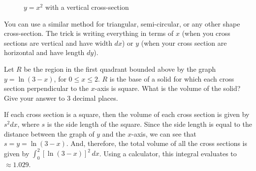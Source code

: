 \begin{figure}[htbp]
\centering
	\caption{$y = x^2$ with a vertical cross-section}
	\label{fig:parab} 
\end{figure}

You can use a similar method for triangular, semi-circular, or any other shape 
cross-section. The trick is writing everything in terms of $x$ (when you cross 
sections are vertical and have width $dx$) or $y$ (when your cross section are 
horizontal and have length $dy$). 

\begin{Exercise} Let $R$ be the region in the first 
quadrant bounded above by the graph $y = \ln{(3 - x)}$, for $0 \leq x \leq 2$. 
$R$ is the base of a solid for which each cross section perpendicular to the 
$x$-axis is square. What is the volume of the solid? Give your answer to 3 
decimal places. 
\end{Exercise}

\begin{Answer}[ref=AP_87]
If each cross section is a square, then the volume of each cross section is 
given by $s^2 dx$, where $s$ is the side length of the square. Since the side 
length is equal to the distance between the graph of $y$ and the $x$-axis, we 
can see that $s = y = \ln{(3 - x)}$. And, therefore, the total volume of all 
the cross sections is given by $\int_0^2 \left[\ln{(3 - x)} \right]^2\,dx$. 
Using a calculator, this integral evaluates to $\approx 1.029$. 
\end{Answer}

